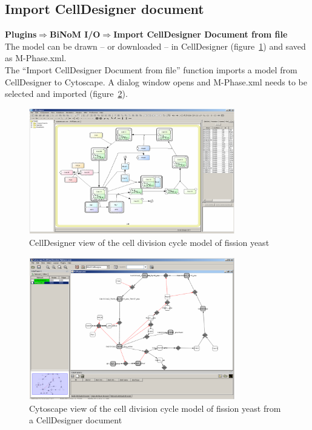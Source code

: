 \subsection{Import CellDesigner document}
\textbf{Plugins$\Rightarrow$BiNoM I/O$\Rightarrow$Import CellDesigner Document from file}\\
The model can be drawn – or downloaded\cite{novak1998model} – in CellDesigner (figure~\ref{CellDesigner_view_of_yeast_cell_division}) and saved as M-Phase.xml.\\
The “Import CellDesigner Document from file” function imports a model from CellDesigner to Cytoscape.  A dialog window opens and M-Phase.xml needs to be selected and imported (figure~\ref{Cytoscape_view_of_yeast_cell_division}).\\
\begin{figure}
\centering
\includegraphics[width=0.8\textwidth]{graphics/CellDesigner_view_of_yeast_cell_division}
\caption{CellDesigner view of the cell division cycle model of fission yeast\cite{novak1998model}}
\label{CellDesigner_view_of_yeast_cell_division}
\end{figure}\begin{figure}
\centering
\includegraphics[width=0.8\textwidth]{graphics/Cytoscape_view_of_yeast_cell_division}
\caption{Cytoscape view of the cell division cycle model of fission yeast from a CellDesigner document}
\label{Cytoscape_view_of_yeast_cell_division}
\end{figure}
